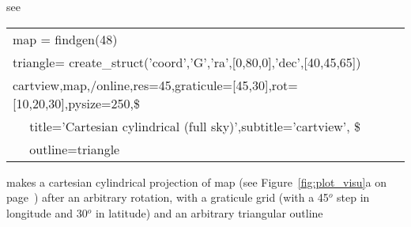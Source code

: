 \renewcommand{\projfullname}{a cartesian}
\begin{codedescription}
{}
\end{codedescription}

%
\begin{related}
  \begin{sulist}{} %
  \item[{\ }] see 
  \end{sulist}
\end{related}


\begin{example}
{
\begin{tabular}{l} %

map  = findgen(48) \\
triangle= create\_struct('coord','G','ra',[0,80,0],'dec',[40,45,65]) \\
cartview,map,/online,res=45,graticule=[45,30],rot=[10,20,30],pysize=250,\$ \\
$\quad$	   title='Cartesian cylindrical (full sky)',subtitle='cartview', \$ \\
$\quad$           outline=triangle \\
\end{tabular}
}
{makes a cartesian cylindrical projection of map (see Figure~\ref{fig:plot_visu}a on
page~\pageref{page:plot_visu}) after an arbitrary rotation, with a graticule grid
(with a 45$^o$ step in longitude and 30$^o$ in latitude) and an arbitrary triangular outline}
\end{example}

\newpage
